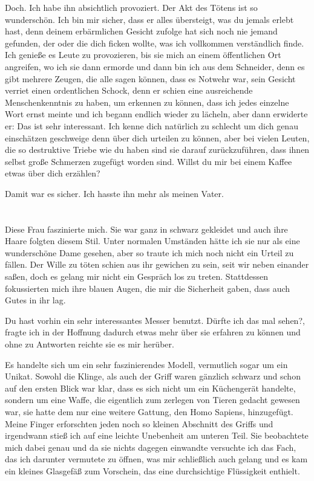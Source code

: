 \documentclass[11pt, a5paper]{article}
\begin{document}
\begin{spacing}{1.2}
		\frqq Doch. Ich habe ihn absichtlich provoziert. Der Akt des Tötens ist so wunderschön. Ich bin mir sicher, dass er alles übersteigt, was du jemals erlebt hast, denn deinem erbärmlichen Gesicht zufolge hat sich noch nie jemand gefunden, der oder die dich ficken wollte, was ich vollkommen verständlich finde. Ich genieße es Leute zu provozieren, bis sie mich an einem öffentlichen Ort angreifen, wo ich sie dann ermorde und dann bin ich aus dem Schneider, denn es gibt mehrere Zeugen, die alle sagen können, dass es Notwehr war\flqq, sein Gesicht verriet einen ordentlichen Schock, denn er schien eine ausreichende Menschenkenntnis zu haben, um erkennen zu können, dass ich jedes einzelne Wort ernst meinte und ich begann endlich wieder zu lächeln, aber dann erwiderte er: \frqq Das ist sehr interessant. Ich kenne dich natürlich zu schlecht um dich genau einschätzen geschweige denn über dich urteilen zu können, aber bei vielen Leuten, die so destruktive Triebe wie du haben sind sie darauf zurückzuführen, dass ihnen selbst große Schmerzen zugefügt worden sind. Willst du mir bei einem Kaffee etwas über dich erzählen?\flqq
		
		Damit war es sicher. Ich hasste ihn mehr als meinen Vater.\newpage
		
		\section{}
		Diese Frau faszinierte mich. Sie war ganz in schwarz gekleidet und auch ihre Haare folgten diesem Stil. Unter normalen Umständen hätte ich sie nur als eine wunderschöne Dame gesehen, aber so traute ich mich noch nicht ein Urteil zu fällen. Der Wille zu töten schien aus ihr gewichen zu sein, seit wir neben einander saßen, doch es gelang mir nicht ein Gespräch los zu treten. Stattdessen fokussierten mich ihre blauen Augen, die mir die Sicherheit gaben, dass auch Gutes in ihr lag.
		
		\frqq Du hast vorhin ein sehr interessantes Messer benutzt. Dürfte ich das mal sehen?\flqq , fragte ich in der Hoffnung dadurch etwas mehr über sie erfahren zu können und ohne zu Antworten reichte sie es mir herüber.
		
		Es handelte sich um ein sehr faszinierendes Modell, vermutlich sogar um ein Unikat. Sowohl die Klinge, als auch der Griff waren gänzlich schwarz und schon auf den ersten Blick war klar, dass es sich nicht um ein Küchengerät handelte, sondern um eine Waffe, die eigentlich zum zerlegen von Tieren gedacht gewesen war, sie hatte dem nur eine weitere Gattung, den Homo Sapiens, hinzugefügt. Meine Finger erforschten jeden noch so kleinen Abschnitt des Griffs und irgendwann stieß ich auf eine leichte Unebenheit am unteren Teil. Sie beobachtete mich dabei genau und da sie nichts dagegen einwandte versuchte ich das Fach, das ich darunter vermutete zu öffnen, was mir schließlich auch gelang und es kam ein kleines Glasgefäß zum Vorschein, das eine durchsichtige Flüssigkeit enthielt.
		

\end{spacing}
\end{document}
